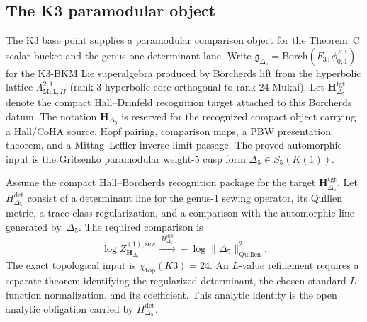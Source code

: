 \subsection*{The K3 paramodular object}
\label{sec:guide-k3-master-object}

The K3 base point supplies a paramodular comparison object for the
Theorem~C scalar bucket and the genus-one determinant lane. Write
$\mathfrak g_{\Delta_5} = \mathrm{Borch}(F_3,\phi^{K3}_{0,1})$ for
the K3-BKM Lie superalgebra produced by Borcherds lift from the
hyperbolic lattice $\Lambda_{\mathrm{Muk},II}^{2,1}$ (rank-$3$
hyperbolic core orthogonal to rank-$24$ Mukai).  Let
\(\mathbf H_{\Delta_5}^{\mathrm{tgt}}\) denote the compact
Hall--Drinfeld recognition target attached to this Borcherds datum.
The notation \(\mathbf H_{\Delta_5}\) is reserved for the recognized
compact object carrying a Hall/CoHA source, Hopf pairing, comparison
maps, a PBW presentation theorem, and a Mittag--Leffler inverse-limit
passage.  The proved automorphic input is the Gritsenko paramodular
weight-$5$ cusp form $\Delta_5 \in S_5(K(1))$.

\begin{theorem}\label{thm:guide-k3-master-L-value}
Assume the compact Hall--Borcherds recognition package for the target
\(\mathbf H_{\Delta_5}^{\mathrm{tgt}}\).  Let
$H_{\Delta_5}^{\mathrm{det}}$ consist of a determinant line for the
genus-$1$ sewing operator, its Quillen metric, a trace-class
regularization, and a comparison with the automorphic line generated
by~$\Delta_5$.  The required comparison is
\[
\log Z^{(1),\mathrm{sew}}_{\mathbf H_{\Delta_5}}
\xrightarrow{\ H_{\Delta_5}^{\mathrm{det}}\ }
-\log\bigl\|\Delta_5\bigr\|^2_{\mathrm{Quillen}}.
\]
The exact topological input is
$\chi_{\mathrm{top}}(K3)=24$.  An $L$-value refinement requires a
separate theorem identifying the regularized determinant, the chosen
standard $L$-function normalization, and its coefficient.  This
analytic identity is the open analytic obligation carried by
$H_{\Delta_5}^{\mathrm{det}}$.
\end{theorem}

